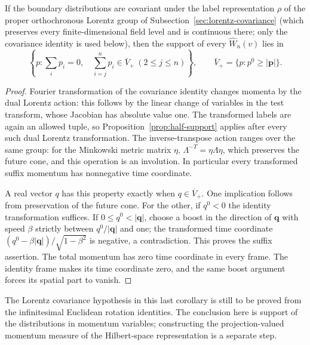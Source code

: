 \begin{corollary}\label{cor:cone-support}
If the boundary distributions are covariant under the label representation
$\rho$ of the proper orthochronous Lorentz group of
Subsection~\ref{sec:lorentz-covariance} (which preserves every
finite-dimensional field level and is continuous there; only the
covariance identity is used below), then
the support of every $\widehat W_n(v)$ lies in
\[
 \left\{p:\sum_i p_i=0,\quad \sum_{i=j}^n p_i\in\overline V_+
                                     \ (2\leq j\leq n)\right\},
 \qquad \overline V_+=\{p:p^0\geq|\mathbf p|\}.
\]
\end{corollary}
\begin{proof}
Fourier transformation of the covariance identity changes momenta by the
dual Lorentz action: this follows by the linear change of variables in the
test transform, whose Jacobian has absolute value one. The transformed
labels are again an allowed tuple, so Proposition~\ref{prop:half-support}
applies after every such dual Lorentz transformation. The inverse-transpose
action ranges over the same group: for the Minkowski metric matrix $\eta$,
$\Lambda^{-T}=\eta\Lambda\eta$, which preserves the future cone, and
this operation is an involution. In particular every transformed
suffix momentum has nonnegative time coordinate.

A real vector $q$ has this property exactly when $q\in\overline V_+$.
One implication follows from preservation of the future cone. For the
other, if $q^0<0$ the identity transformation suffices. If
$0\leq q^0<|\mathbf q|$, choose a boost in the direction of
$\mathbf q$ with speed $\beta$ strictly between $q^0/|\mathbf q|$ and
one; the transformed time coordinate
$(q^0-\beta|\mathbf q|)/\sqrt{1-\beta^2}$ is negative, a contradiction.
This proves the suffix assertion. The total momentum has zero time
coordinate in every frame. The identity frame makes its time coordinate
zero, and the same boost argument forces its spatial part to vanish.
\end{proof}

The Lorentz covariance hypothesis in this last corollary is still to be
proved from the infinitesimal Euclidean rotation identities. The conclusion
here is support of the distributions in momentum variables; constructing
the projection-valued momentum measure of the Hilbert-space representation
is a separate step.
